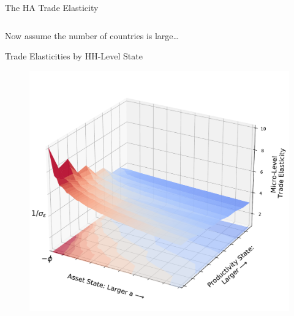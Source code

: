 \documentclass[9pt,pdftex,aspectratio=1610]{beamer}
\theoremstyle{definition}
\begin{document}
\begin{frame}[t]{The HA Trade Elasticity}
{{\begin{align*}
\end{align*}}\\
\bigskip
Now assume the number of countries is large\ldots\\
}
\end{frame}




\begin{frame}[t]{Trade Elasticities by HH-Level State}
\vspace{-.5cm}
\begin{figure}[t]
\centerline{
\includegraphics[scale = 0.45]{../notes/figures/micro-elasticity.pdf}}
\end{figure}
\end{frame}
\end{document}
